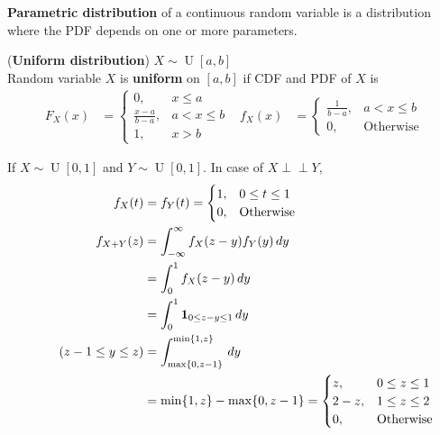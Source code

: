 \documentclass{huhtakm-template-book}
\newcommand{\independent}{\perp\!\!\!\perp}
\DeclareMathOperator{\U}{U}
\begin{document}
\begin{defn}
	\textbf{Parametric distribution} of a continuous random variable is a distribution where the PDF depends on one or more parameters.
\end{defn}
\begin{eg}(\textbf{Uniform distribution}) $X\sim\U[a,b]$\\
	Random variable $X$ is \textbf{uniform} on $[a,b]$ if CDF and PDF of $X$ is
	\begin{align*}
		F_{X}(x)&=\begin{cases}
			0, &x\leq a\\
			\frac{x-a}{b-a}, &a<x\leq b\\
			1, &x>b
		\end{cases} & f_{X}(x)&=\begin{cases}
			\frac{1}{b-a}, &a<x\leq b\\
			0, &\text{Otherwise}
		\end{cases}
	\end{align*}
\end{eg}
\begin{eg}
	If $X\sim\U[0,1]$ and $Y\sim\U[0,1]$. In case of $X\independent Y$,
	\begin{align*}
		f_{X}(t)&=f_{Y}(t)=\begin{cases}
			1, &0\leq t\leq 1\\
			0, &\text{Otherwise}
		\end{cases}\\
		f_{X+Y}(z)&=\int_{-\infty}^{\infty} f_{X}(z-y)f_{Y}(y)\,dy\\
		&=\int_{0}^{1}f_{X}(z-y)\,dy\\
		&=\int_{0}^{1}\mathbf{1}_{0\leq z-y\leq 1}\,dy\\
		\tag{$z-1\leq y\leq z$}
		&=\int_{\max\{0,z-1\}}^{\min\{1,z\}}\,dy\\
		&=\min\{1,z\}-\max\{0,z-1\}=\begin{cases}
			z, &0\leq z\leq 1\\
			2-z, &1\leq z\leq 2\\
			0, &\text{Otherwise}
		\end{cases}
	\end{align*}
\end{eg}
\end{document}

